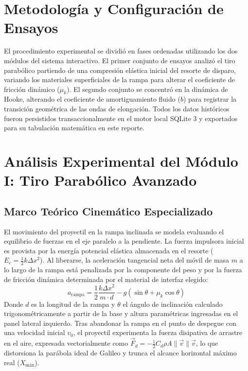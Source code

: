 \documentclass[11pt,a4paper]{article}
\begin{document}
	\section{Metodología y Configuración de Ensayos}
	El procedimiento experimental se dividió en fases ordenadas utilizando los dos módulos del sistema interactivo. El primer conjunto de ensayos analizó el tiro parabólico partiendo de una compresión elástica inicial del resorte de disparo, variando los materiales superficiales de la rampa para alterar el coeficiente de fricción dinámico ($\mu_k$). El segundo conjunto se concentró en la dinámica de Hooke, alterando el coeficiente de amortiguamiento fluido ($b$) para registrar la transición geométrica de las ondas de elongación. Todos los datos históricos fueron persistidos transaccionalmente en el motor local SQLite 3 y exportados para su tabulación matemática en este reporte.
	
	\section{Análisis Experimental del Módulo I: Tiro Parabólico Avanzado}
	
	\subsection{Marco Teórico Cinemático Especializado}
	El movimiento del proyectil en la rampa inclinada se modela evaluando el equilibrio de fuerzas en el eje paralelo a la pendiente. La fuerza impulsora inicial es provista por la energía potencial elástica almacenada en el resorte ($E_e = \frac{1}{2} k \Delta x^2$). Al liberarse, la aceleración tangencial neta del móvil de masa $m$ a lo largo de la rampa está penalizada por la componente del peso y por la fuerza de fricción dinámica determinada por el material de interfaz elegido:
	\begin{equation}
		a_{\text{rampa}} = \frac{1}{2}\frac{k \Delta x^2}{m \cdot d} - g(\sin\theta + \mu_k\cos\theta)
	\end{equation}
	Donde $d$ es la longitud de la rampa y $\theta$ el ángulo de inclinación calculado trigonométricamente a partir de la base y altura paramétricas ingresadas en el panel lateral izquierdo. Tras abandonar la rampa en el punto de despegue con una velocidad inicial $v_0$, el proyectil experimenta la fuerza disipativa de arrastre en el aire, expresada vectorialmente como $\vec{F}_d = -\frac{1}{2} C_d \rho A \|\vec{v}\|\vec{v}$, lo que distorsiona la parábola ideal de Galileo y trunca el alcance horizontal máximo real ($X_{\text{máx}}$).
	
\end{document}
